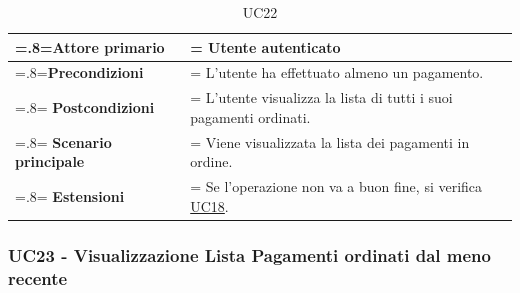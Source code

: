                 \begin{table}[H]
                    \centering
                    \renewcommand{\arraystretch}{1.8}
                    \renewcommand\tabularxcolumn[1]{m{#1}}
                    \begin{tabularx}{0.9\textwidth} {
                        >{\hsize=.8\hsize\linewidth=\hsize}X
                        >{\hsize=1.2\hsize\linewidth=\hsize}X}
                        \hline
                        \textbf{Attore primario} & Utente autenticato \\
                        \hline
                        \textbf{Precondizioni} & L'utente ha effettuato almeno un pagamento. \\
                        \hline
                        \textbf{Postcondizioni} & L'utente visualizza la lista di tutti i suoi pagamenti ordinati. \\
                        \hline
                        \textbf{Scenario principale} & Viene visualizzata la lista dei pagamenti in ordine. \\
                        \hline
                        \textbf{Estensioni} & Se l'operazione non va a buon fine, si verifica \hyperref[UC18]{UC18}. \\
                        \hline
                    \end{tabularx}
                    \caption{UC22}
                \end{table}


            \subsubsection{UC23 - Visualizzazione Lista Pagamenti ordinati dal meno recente}
            \label{UC23}


